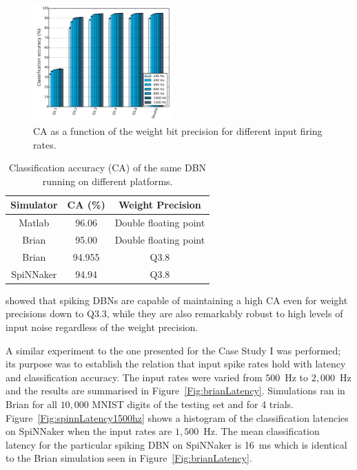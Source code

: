 \documentclass{frontiersENG} %
\begin{document}
\begin{figure}[hbt!]
	\centering
	\includegraphics[width=0.48\textwidth]{fig9}
	\caption{CA as a function of the weight bit precision for different input firing rates.}
	\label{Fig:brianCAfiringrate}
\end{figure} 


\begin{table}[h]
	\caption{Classification accuracy (CA) of the same DBN running on different platforms.}
	\begin{center}
		\begin{tabular} {c|c|c}
			Simulator & CA (\%) & Weight Precision \\
			\hline
			Matlab & 96.06 & Double floating point\\
			Brian & 95.00 & Double floating point\\
			Brian & 94.955 & Q3.8\\
			SpiNNaker & 94.94 & Q3.8\\
		\end{tabular}
		\label{tab:casimulators}
	\end{center}
\end{table}

\citet{stromatias2015robustness} showed that spiking DBNs are capable of maintaining a high CA even for weight precisions down to Q3.3, while they are also remarkably robust to high levels of input noise regardless of the weight precision. 

A similar experiment to the one presented for the Case Study I was performed; its purpose was to establish the relation that input spike rates hold with latency and classification accuracy.
The input rates were varied from 500~Hz to $2,000$~Hz and the results are summarised in Figure~\ref{Fig:brianLatency}. Simulations ran in Brian for all $10,000$ MNIST digits of the testing set and for 4 trials. Figure~\ref{Fig:spinnLatency1500hz} shows a histogram of the classification latencies on SpiNNaker when the input rates are $1,500$~Hz. The mean classification latency for the particular spiking DBN on SpiNNaker is 16~ms which is identical to the Brian simulation seen in Figure~\ref{Fig:brianLatency}.
\end{document}
